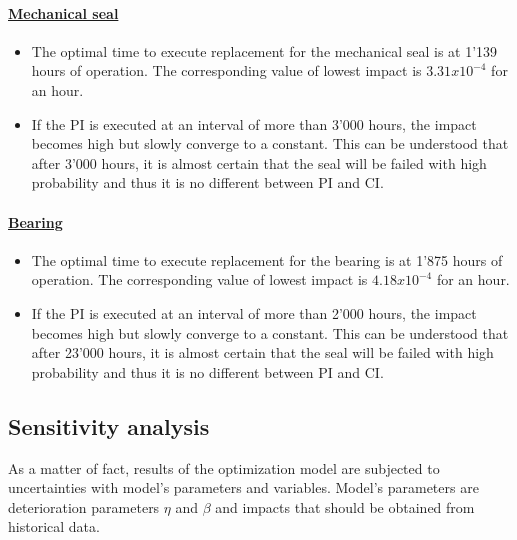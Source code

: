 \paragraph{\underline{Mechanical seal}}
\begin{itemize}
\item The optimal time to execute replacement for the mechanical seal is at 1'139 hours of operation. The corresponding value of lowest impact is $3.31x10^{-4}$ for an hour. %
\item If the PI is executed at an interval of more than 3'000 hours, the impact becomes high but slowly converge to a constant. This can be understood that after 3'000 hours, it is almost certain that the seal will be failed with high probability and thus it is no different between PI and CI.

\end{itemize}

\paragraph{\underline{Bearing}}
\begin{itemize}
	\item The optimal time to execute replacement for the bearing is at 1'875 hours of operation. The corresponding value of lowest impact is $4.18x10^{-4}$ for an hour. %
	\item If the PI is executed at an interval of more than 2'000 hours, the impact becomes high but slowly converge to a constant. This can be understood that after 23'000 hours, it is almost certain that the seal will be failed with high probability and thus it is no different between PI and CI.

\end{itemize}

\subsection{Sensitivity analysis}
As a matter of fact, results of the optimization model are subjected to uncertainties with model's parameters and variables. Model's parameters are deterioration parameters $\eta$ and $\beta$ and impacts that should be obtained from historical data.

